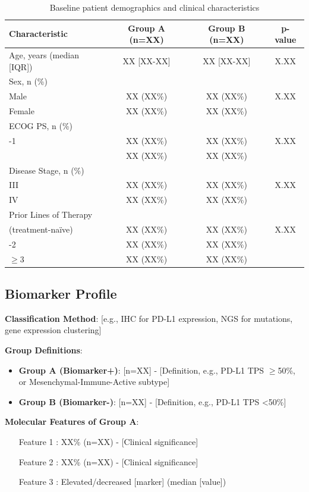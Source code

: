 \documentclass[10pt,letterpaper]{article}
\begin{document}
\begin{table}[H]
\centering
\small
\begin{tabular}{lccc}
\toprule
\textbf{Characteristic} & \textbf{Group A (n=XX)} & \textbf{Group B (n=XX)} & \textbf{p-value} \\
\midrule
Age, years (median [IQR]) & XX [XX-XX] & XX [XX-XX] & X.XX \\
Sex, n (\%) & & & \\
\quad Male & XX (XX\%) & XX (XX\%) & X.XX \\
\quad Female & XX (XX\%) & XX (XX\%) & \\
ECOG PS, n (\%) & & & \\
\quad 0-1 & XX (XX\%) & XX (XX\%) & X.XX \\
\quad 2 & XX (XX\%) & XX (XX\%) & \\
Disease Stage, n (\%) & & & \\
\quad III & XX (XX\%) & XX (XX\%) & X.XX \\
\quad IV & XX (XX\%) & XX (XX\%) & \\
Prior Lines of Therapy & & & \\
\quad 0 (treatment-naïve) & XX (XX\%) & XX (XX\%) & X.XX \\
\quad 1-2 & XX (XX\%) & XX (XX\%) & \\
\quad $\geq$3 & XX (XX\%) & XX (XX\%) & \\
\bottomrule
\end{tabular}
\caption{Baseline patient demographics and clinical characteristics}
\end{table}

\subsection{Biomarker Profile}

\begin{tcolorbox}[colback=biomarkerblue!10,colframe=biomarkerblue,title=\textbf{Biomarker Stratification},fonttitle=\bfseries\small]
{\small
\textbf{Classification Method}: [e.g., IHC for PD-L1 expression, NGS for mutations, gene expression clustering]

\textbf{Group Definitions}:
\begin{itemize}
\item \textbf{Group A (Biomarker+)}: [n=XX] - [Definition, e.g., PD-L1 TPS $\geq$50\%, or Mesenchymal-Immune-Active subtype]
\item \textbf{Group B (Biomarker-)}: [n=XX] - [Definition, e.g., PD-L1 TPS <50\%]
\end{itemize}

\textbf{Molecular Features of Group A}:
\begin{itemize}
\item [Feature 1]: XX\% (n=XX) - [Clinical significance]
\item [Feature 2]: XX\% (n=XX) - [Clinical significance]
\item [Feature 3]: Elevated/decreased [marker] (median [value])
\end{itemize}
}
\end{tcolorbox}
\end{document}

